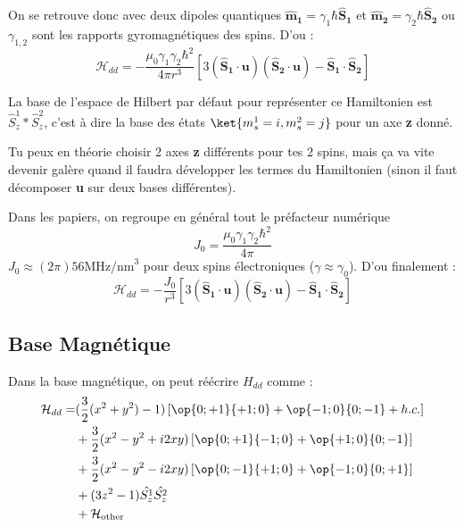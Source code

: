 \documentclass[a4paper]{article}
\begin{document}
 On se retrouve donc avec deux dipoles quantiques $\mathbf{\hat{m}_1}= \gamma_1 \hbar \mathbf{\hat{S}_1}$ et $\mathbf{\hat{m}_2}= \gamma_2 \hbar \mathbf{\hat{S}_2}$ ou $\gamma_{1,2}$ sont les rapports gyromagnétiques des spins. D'ou : 
 \begin{equation}
  \mathcal{H}_{dd}=-\frac{\mu_0 \gamma_1 \gamma_2 \hbar ^2}{4 \pi r^3}[3(\mathbf{\hat{S}_1}\cdot \mathbf{u})(\mathbf{\hat{S}_2}\cdot \mathbf{u})-\mathbf{\hat{S}_1}\cdot \mathbf{\hat{S}_2}]
  \end{equation}
  
  La base de l'espace de Hilbert par défaut pour représenter ce Hamiltonien est $\hat{S}_z^1 \ast \hat{S}_z^2$, c'est à dire la base des états $\ket{m_s^1=i,m_s^2=j}$ pour un axe \textbf{z} donné. 
  
  Tu peux en théorie choisir 2 axes \textbf{z} différents pour tes 2 spins, mais ça va vite devenir galère quand il faudra développer les termes du Hamiltonien (sinon il faut décomposer \textbf{u} sur deux bases différentes).
  
  Dans les papiers, on regroupe en général tout le préfacteur numérique 
  \begin{equation}
  J_0=\frac{\mu_0 \gamma_1 \gamma_2 \hbar ^2}{4 \pi}
  \end{equation}
  $J_0 \approx (2\pi)56 \textrm{MHz/nm}^3$ pour deux spins électroniques ($\gamma \approx \gamma_0$). D'ou finalement :
   \begin{equation}
  \mathcal{H}_{dd}=-\frac{J_0}{r^3}[3(\mathbf{\hat{S}_1}\cdot \mathbf{u})(\mathbf{\hat{S}_2}\cdot \mathbf{u})-\mathbf{\hat{S}_1}\cdot \mathbf{\hat{S}_2}]
  \end{equation}
  \subsection{Base Magnétique}
  Dans la base magnétique, on peut réécrire $H_{dd}$ comme :
  \begin{align}
  \mathcal{H}_{dd}=&(\frac{3}{2}(x^2+y^2)-1)\left[\op{0;+1}{+1;0}+\op{-1;0}{0;-1} + h.c. \right]\\
  &+\frac{3}{2}(x^2-y^2+i2xy)\left[\op{0;+1}{-1;0}+\op{+1;0}{0;-1}\right]\\
  &+\frac{3}{2}(x^2-y^2-i2xy)\left[\op{0;-1}{+1;0}+\op{-1;0}{0;+1}\right]\\
  &+(3z^2-1)\hat{S_z^1}\hat{S_z^2}\\
  &+\mathcal{H}_{\mathrm{other}}
  \end{align}
  
\end{document}
